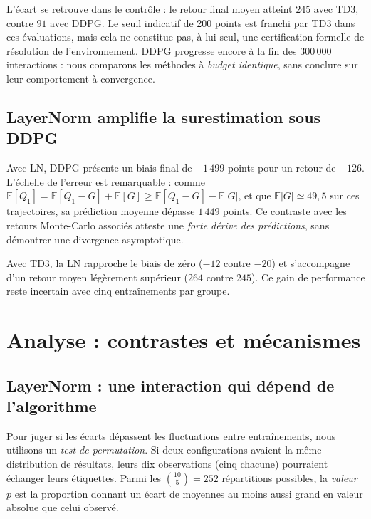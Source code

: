 \documentclass[10pt,a4paper]{article}
\newcommand{\E}{\mathbb{E}}
\begin{document}
L'écart se retrouve dans le contrôle : le retour final moyen atteint $245$ avec TD3, contre $91$ avec DDPG. Le seuil indicatif de 200 points est franchi par TD3 dans ces évaluations, mais cela ne constitue pas, à lui seul, une certification formelle de résolution de l'environnement. DDPG progresse encore à la fin des 300\,000 interactions : nous comparons les méthodes à \emph{budget identique}, sans conclure sur leur comportement à convergence.

\subsection{LayerNorm amplifie la surestimation sous DDPG}
Avec LN, DDPG présente un biais final de $+1\,499$ points pour un retour de $-126$. L'échelle de l'erreur est remarquable : comme $\E[Q_1]=\E[Q_1-G]+\E[G]\geq\E[Q_1-G]-\E|G|$, et que $\E|G|\simeq49{,}5$ sur ces trajectoires, sa prédiction moyenne dépasse $1\,449$ points. Ce contraste avec les retours Monte-Carlo associés atteste une \emph{forte dérive des prédictions}, sans démontrer une divergence asymptotique.

Avec TD3, la LN rapproche le biais de zéro ($-12$ contre $-20$) et s'accompagne d'un retour moyen légèrement supérieur ($264$ contre $245$). Ce gain de performance reste incertain avec cinq entraînements par groupe.

\clearpage
\section{Analyse : contrastes et mécanismes}
\subsection{LayerNorm : une interaction qui dépend de l'algorithme}
Pour juger si les écarts dépassent les fluctuations entre entraînements, nous utilisons un \emph{test de permutation}. Si deux configurations avaient la même distribution de résultats, leurs dix observations (cinq chacune) pourraient échanger leurs étiquettes. Parmi les $\binom{10}{5}=252$ répartitions possibles, la \emph{valeur $p$} est la proportion donnant un écart de moyennes au moins aussi grand en valeur absolue que celui observé.
\begin{table}[H]
\centering\small

\caption{Écarts entre configurations : différence de moyennes = après $-$ avant. Chaque mesure (retour ou biais) possède son propre test bilatéral.}
\label{tab:contrastes}
\end{table}
\end{document}
